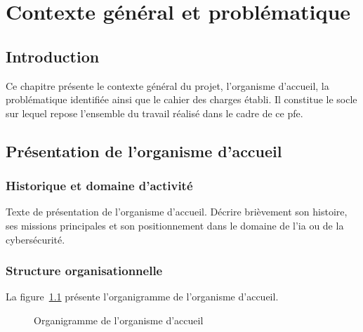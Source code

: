 \chapter{Contexte général et problématique}
\label{chap:contexte}

\section*{Introduction}

Ce chapitre présente le contexte général du projet, l'organisme d'accueil, la problématique identifiée ainsi que le cahier des charges établi. Il constitue le socle sur lequel repose l'ensemble du travail réalisé dans le cadre de ce \gls{pfe}.

\section{Présentation de l'organisme d'accueil}
\label{sec:organisme}

\subsection{Historique et domaine d'activité}

\hspace{1cm}Texte de présentation de l'organisme d'accueil. Décrire brièvement son histoire, ses missions principales et son positionnement dans le domaine de l'\gls{ia} ou de la cybersécurité.

\subsection{Structure organisationnelle}

La figure~\ref{fig:organigramme} présente l'organigramme de l'organisme d'accueil.

\begin{figure}[H]
  \centering
  \caption{Organigramme de l'organisme d'accueil}
  \label{fig:organigramme}
\end{figure}

